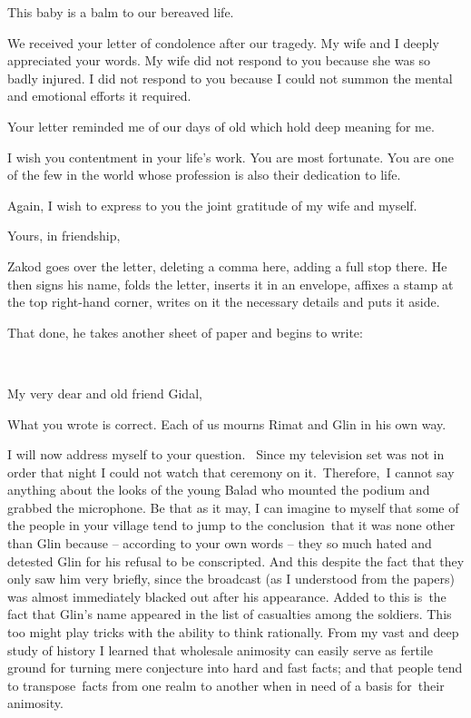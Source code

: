 \documentclass[letterpaper]{article}
\begin{document}
This baby is a balm to our bereaved life.

We received your letter of condolence after our tragedy. My wife and I deeply appreciated your words. My wife did not
respond to you because she was so badly injured. I did not respond to you because I could not summon the mental and
emotional efforts it required.

Your letter reminded me of our days of old which hold deep meaning for me.\ 

I wish you contentment in your life's work. You are most fortunate. You are one of the few in the world whose profession
is also their dedication to life.

Again, I wish to express to you the joint gratitude of my wife and myself.

Yours, in friendship,

Zakod goes over the letter, deleting a comma here, adding a full stop there. He then signs his name, folds the letter,
inserts it in an envelope, affixes a stamp at the top right-hand corner, writes on it the necessary details and puts it
aside.

That done, he takes another sheet of paper and begins to write:

~

My very dear and old friend Gidal,\ 

What you wrote is correct. Each of us mourns Rimat and Glin in his own way.

I will now address myself to your question. ~Since my television set was not in order that night I could not watch that
ceremony on it.\ Therefore,\ I cannot say anything about the looks of the young Balad who mounted the podium and
grabbed the microphone. Be that as it may, I can imagine to myself that some of the people in your village tend to jump
to the conclusion~that it was none other than Glin because -- according to your own words -- they {\textquotedbl}so
much hated and detested Glin for his refusal to be conscripted.{\textquotedbl} And this despite the fact that they only
saw him very briefly, since the broadcast (as I understood from the papers) was almost immediately blacked out after
his appearance. Added to this is~the fact that Glin's name appeared in the list of casualties among the soldiers. This
too might play tricks with the ability to think rationally. From my vast and deep study of history I learned that
wholesale animosity can easily serve as fertile ground for turning mere conjecture into hard and fast facts; and that
people tend to transpose~facts from one realm to another when in need of a basis for~their animosity.
\end{document}
